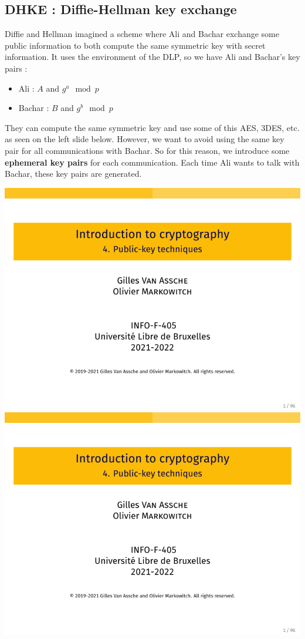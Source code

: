 \documentclass[../Cryptography.tex]{subfiles}
\begin{document}
\subsection{DHKE : Diffie-Hellman key exchange}
Diffie and Hellman imagined a scheme where Ali and Bachar exchange some public information to both compute the same symmetric key with secret information. It uses the environment of the DLP, so we have Ali and Bachar's key pairs :
\begin{itemize}
    \item Ali : $A$ and $g^a\mod{p}$
    \item Bachar : $B$ and $g^b\mod{p}$
\end{itemize}

They can compute the same symmetric key and use some of this AES, 3DES, etc. as seen on the left slide below. However, we want to avoid using the same key pair for all communications with Bachar. So for this reason, we introduce some \textbf{ephemeral key pairs} for each communication. Each time Ali wants to talk with Bachar, these key pairs are generated.

\begin{center}
    \includegraphics[width=0.45\linewidth, page=76]{Slides/4-Public.pdf}
    \includegraphics[width=0.45\linewidth, page=78]{Slides/4-Public.pdf}
\end{center}
\end{document}
